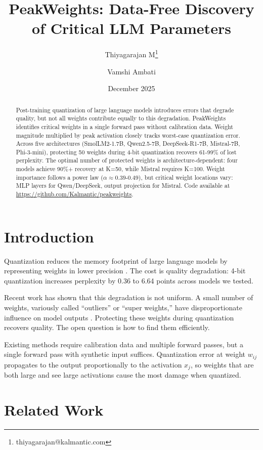 \documentclass{article}
\title{PeakWeights: Data-Free Discovery of Critical LLM Parameters}
\author[1]{Thiyagarajan M\thanks{thiyagarajan@kalmantic.com}}
\author[2]{Vamshi Ambati}
\affil[1]{Kalmantic Labs}
\affil[2]{Carnegie Mellon University; IIIT Hyderabad}
\date{December 2025}
\begin{document}
\maketitle

\begin{abstract}
Post-training quantization of large language models introduces errors that degrade quality, but not all weights contribute equally to this degradation. PeakWeights identifies critical weights in a single forward pass without calibration data. Weight magnitude multiplied by peak activation closely tracks worst-case quantization error. Across five architectures (SmolLM2-1.7B, Qwen2.5-7B, DeepSeek-R1-7B, Mistral-7B, Phi-3-mini), protecting 50 weights during 4-bit quantization recovers 61-99\% of lost perplexity. The optimal number of protected weights is architecture-dependent: four models achieve 90\%+ recovery at K=50, while Mistral requires K=100. Weight importance follows a power law ($\alpha \approx 0.39$-$0.49$), but critical weight locations vary: MLP layers for Qwen/DeepSeek, output projection for Mistral. Code available at \url{https://github.com/Kalmantic/peakweights}.
\end{abstract}

\section{Introduction}

Quantization reduces the memory footprint of large language models by representing weights in lower precision \citep{dettmers2022llmint8, frantar2022gptq}. The cost is quality degradation: 4-bit quantization increases perplexity by 0.36 to 6.64 points across models we tested.

Recent work has shown that this degradation is not uniform. A small number of weights, variously called ``outliers'' or ``super weights,'' have disproportionate influence on model outputs \citep{yu2024superweight}. Protecting these weights during quantization recovers quality. The open question is how to find them efficiently.

Existing methods require calibration data and multiple forward passes, but a single forward pass with synthetic input suffices. Quantization error at weight $w_{ij}$ propagates to the output proportionally to the activation $x_j$, so weights that are both large and see large activations cause the most damage when quantized.

\section{Related Work}
\end{document}
